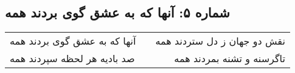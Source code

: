 \begin{center}
\section*{شماره ۵: آنها که به عشق گوی بردند همه}
\label{sec:005}
\begin{longtable}{l p{0.5cm} r}
آنها که به عشق گوی بردند همه
&&
نقش دو جهان ز دل ستردند همه
\\
صد بادیه هر لحظه سپردند همه
&&
تاگرسنه و تشنه بمردند همه
\\
\end{longtable}
\end{center}
